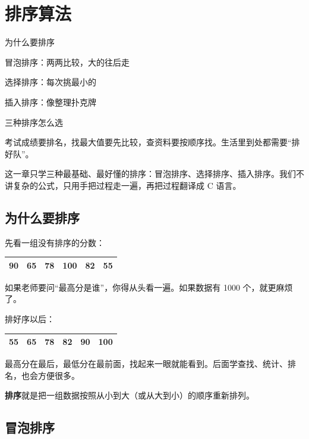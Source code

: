 \chapter{排序算法}

\begin{introduction}
  \item 为什么要排序
  \item 冒泡排序：两两比较，大的往后走
  \item 选择排序：每次挑最小的
  \item 插入排序：像整理扑克牌
  \item 三种排序怎么选
\end{introduction}


考试成绩要排名，找最大值要先比较，查资料要按顺序找。生活里到处都需要“排好队”。

这一章只学三种最基础、最好懂的排序：冒泡排序、选择排序、插入排序。我们不讲复杂的公式，只用手把过程走一遍，再把过程翻译成 C 语言。

\section{为什么要排序}

先看一组没有排序的分数：

\begin{center}
\begin{tabular}{@{}cccccc@{}}
\toprule
90 & 65 & 78 & 100 & 82 & 55 \\
\bottomrule
\end{tabular}
\end{center}

如果老师要问“最高分是谁”，你得从头看一遍。如果数据有 1000 个，就更麻烦了。

排好序以后：

\begin{center}
\begin{tabular}{@{}cccccc@{}}
\toprule
55 & 65 & 78 & 82 & 90 & 100 \\
\bottomrule
\end{tabular}
\end{center}

最高分在最后，最低分在最前面，找起来一眼就能看到。后面学查找、统计、排名，也会方便很多。

\textbf{排序}就是把一组数据按照从小到大（或从大到小）的顺序重新排列。

\section{冒泡排序}

